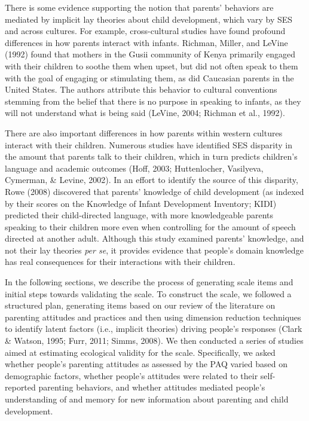 \documentclass[floatsintext,man]{apa6}
\theoremstyle{definition}
\theoremstyle{definition}
\theoremstyle{definition}
\theoremstyle{remark}
\begin{document}
There is some evidence supporting the notion that parents' behaviors are
mediated by implicit lay theories about child development, which vary by
SES and across cultures. For example, cross-cultural studies have found
profound differences in how parents interact with infants. Richman,
Miller, and LeVine (1992) found that mothers in the Gusii community of
Kenya primarily engaged with their children to soothe them when upset,
but did not often speak to them with the goal of engaging or stimulating
them, as did Caucasian parents in the United States. The authors
attribute this behavior to cultural conventions stemming from the belief
that there is no purpose in speaking to infants, as they will not
understand what is being said (LeVine, 2004; Richman et al., 1992).

There are also important differences in how parents within western
cultures interact with their children. Numerous studies have identified
SES disparity in the amount that parents talk to their children, which
in turn predicts children's language and academic outcomes (Hoff, 2003;
Huttenlocher, Vasilyeva, Cymerman, \& Levine, 2002). In an effort to
identify the source of this disparity, Rowe (2008) discovered that
parents' knowledge of child development (as indexed by their scores on
the Knowledge of Infant Development Inventory; KIDI) predicted their
child-directed language, with more knowledgeable parents speaking to
their children more even when controlling for the amount of speech
directed at another adult. Although this study examined parents'
knowledge, and not their lay theories \emph{per se}, it provides
evidence that people's domain knowledge has real consequences for their
interactions with their children.

In the following sections, we describe the process of generating scale
items and initial steps towards validating the scale. To construct the
scale, we followed a structured plan, generating items based on our
review of the literature on parenting attitudes and practices and then
using dimension reduction techniques to identify latent factors (i.e.,
implicit theories) driving people's responses (Clark \& Watson, 1995;
Furr, 2011; Simms, 2008). We then conducted a series of studies aimed at
estimating ecological validity for the scale. Specifically, we asked
whether people's parenting attitudes as assessed by the PAQ varied based
on demographic factors, whether people's attitudes were related to their
self-reported parenting behaviors, and whether attitudes mediated
people's understanding of and memory for new information about parenting
and child development.
\end{document}
